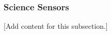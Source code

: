 
\subsubsection{Science Sensors}
\label{subsubsec:design_6_7_science_sensors}

[Add content for this subsection.]
